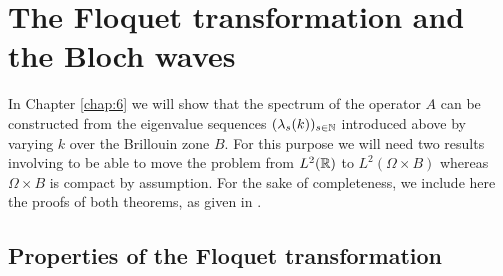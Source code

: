\chapter{The Floquet transformation and the Bloch waves} \label{chap:5}

In Chapter \ref{chap:6} we will show that the spectrum of the operator $A$ can be constructed from the eigenvalue sequences $(\lambda_{s}(k))_{s \in \mathbb{N}}$ introduced above by varying $k$ over the Brillouin zone $B$. For this purpose we will need two results involving to be able to move the problem from $L^{2}(\mathbb{R})$ to $L^{2}(\Omega \times B)$ whereas $\Omega \times B$ is compact by assumption. For the sake of completeness, we include here the proofs of both theorems, as given in \cite[section 3.4, 3.5]{dorfler2011photonic}.

\section{Properties of the Floquet transformation} \label{sec:5.1}


